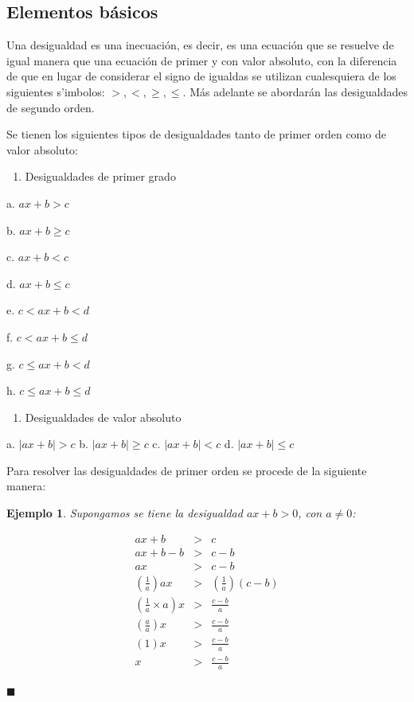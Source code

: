 \documentclass[]{book}
\providecommand{\tightlist}{%
  \setlength{\itemsep}{0pt}\setlength{\parskip}{0pt}}
\newtheorem{Ejem}{Ejemplo}[chapter]
\begin{document}
\subsection{Elementos b\'asicos}

Una desigualdad es una inecuación, es decir, es una ecuación que se
resuelve de igual manera que una ecuación de primer y con valor
absoluto, con la diferencia de que en lugar de considerar el signo de
igualdas se utilizan cualesquiera de los siguientes s'imbolos:
\(>,<,\geq,\leq\). Más adelante se abordarán las desigualdades de
segundo orden.

Se tienen los siguientes tipos de desigualdades tanto de primer orden
como de valor absoluto:

\begin{enumerate}
\def\labelenumi{\arabic{enumi}.}
\tightlist
\item
  Desigualdades de primer grado
\end{enumerate}

\begin{multicols}{2}
a. $ax+b>c$

b. $ax+b\geq c$

c. $ax+b<c$

d. $ax+b\leq c$

e. $c<ax+b< d$

f. $c<ax+b\leq d$

g. $c\leq ax+b< d$

h. $c\leq ax+b\leq d$
\end{multicols}

\begin{enumerate}
\def\labelenumi{\arabic{enumi}.}
\setcounter{enumi}{1}
\tightlist
\item
  Desigualdades de valor absoluto
\end{enumerate}

\begin{multicols}{2}
a. $|ax+b|>c$
b. $|ax+b|\geq c$
c. $|ax+b|<c$
d. $|ax+b|\leq c$
\end{multicols}

Para resolver las desigualdades de primer orden se procede de la
siguiente manera:

\begin{Ejem}
Supongamos se tiene la desigualdad $ax+b>0$, con $a\neq0$: 

\begin{eqnarray*}
ax+b&>&c\\
ax+b-b&>&c-b\\
ax&>&c-b\\
\left(\frac{1}{a}\right)ax&>&\left(\frac{1}{a}\right)\left(c-b\right)\\
\left(\frac{1}{a}\times a\right)x&>&\frac{c-b}{a}\\
\left(\frac{a}{a}\right)x&>&\frac{c-b}{a}\\
\left(1\right)x&>&\frac{c-b}{a}\\
x&>&\frac{c-b}{a}
\end{eqnarray*}

\begin{flushright}
$\blacksquare$
\end{flushright}

\end{Ejem}
\end{document}
